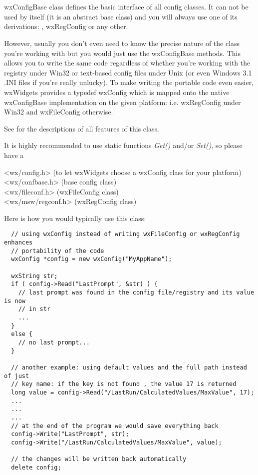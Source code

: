 \section{}\label{wxconfigbase}

wxConfigBase class defines the basic interface of all config classes. It can
not be used by itself (it is an abstract base class) and you will always use one
of its derivations: ,
wxRegConfig or any other.

However, usually you don't even need to know the precise nature of the class
you're working with but you would just use the wxConfigBase methods. This
allows you to write the same code regardless of whether you're working with
the registry under Win32 or text-based config files under Unix (or even
Windows 3.1 .INI files if you're really unlucky). To make writing the portable
code even easier, wxWidgets provides a typedef wxConfig
which is mapped onto the native wxConfigBase implementation on the given
platform: i.e. wxRegConfig under Win32 and
wxFileConfig otherwise.

See  for the descriptions of all
features of this class.

It is highly recommended to use static functions {\it Get()} and/or {\it Set()}, 
so please have a 




<wx/config.h> (to let wxWidgets choose a wxConfig class for your platform)\\
<wx/confbase.h> (base config class)\\
<wx/fileconf.h> (wxFileConfig class)\\
<wx/msw/regconf.h> (wxRegConfig class)


Here is how you would typically use this class:

\begin{verbatim}
  // using wxConfig instead of writing wxFileConfig or wxRegConfig enhances
  // portability of the code
  wxConfig *config = new wxConfig("MyAppName");

  wxString str;
  if ( config->Read("LastPrompt", &str) ) {
    // last prompt was found in the config file/registry and its value is now
    // in str
    ...
  }
  else {
    // no last prompt...
  }

  // another example: using default values and the full path instead of just
  // key name: if the key is not found , the value 17 is returned
  long value = config->Read("/LastRun/CalculatedValues/MaxValue", 17);
  ...
  ...
  ...
  // at the end of the program we would save everything back
  config->Write("LastPrompt", str);
  config->Write("/LastRun/CalculatedValues/MaxValue", value);

  // the changes will be written back automatically
  delete config;
\end{verbatim}


